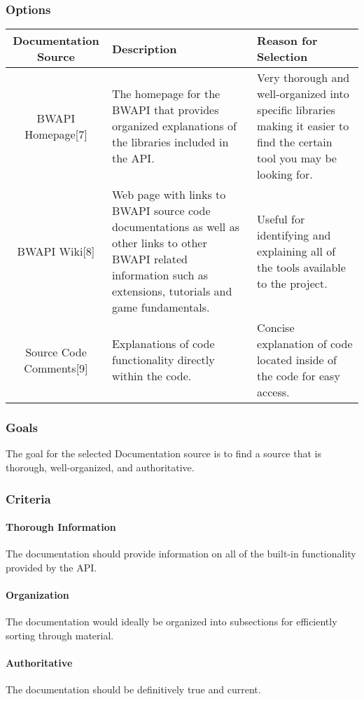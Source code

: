 \subsubsection{Options}
\begin{center}
	\begin{tabular}{ ||C|L|L|| } 
		\hline
		Documentation Source & Description & Reason for Selection \\
		\hline
		BWAPI Homepage[7]  & The homepage for the BWAPI that provides organized explanations of the libraries included in the API. & Very thorough and well-organized into specific libraries making it easier to find the certain tool you may be looking for. \\ 
		\hline
		BWAPI Wiki[8] & Web page with links to BWAPI source code documentations as well as other links to other BWAPI related information such as extensions, tutorials and game fundamentals. & Useful for identifying and explaining all of the tools available to the project. \\ 
		\hline
		Source Code Comments[9] & Explanations of code functionality directly within the code. & Concise explanation of code located inside of the code for easy access. \\
		\hline
	\end{tabular}
\end{center}
\subsubsection{Goals}
The goal for the selected Documentation source is to find a source that is thorough, well-organized, and authoritative.
\subsubsection{Criteria}
	\paragraph{Thorough Information}
	The documentation should provide information on all of the built-in functionality provided by the API.
	\paragraph{Organization}
	The documentation would ideally be organized into subsections for efficiently sorting through material.
	\paragraph{Authoritative}
	The documentation should be definitively true and current.
